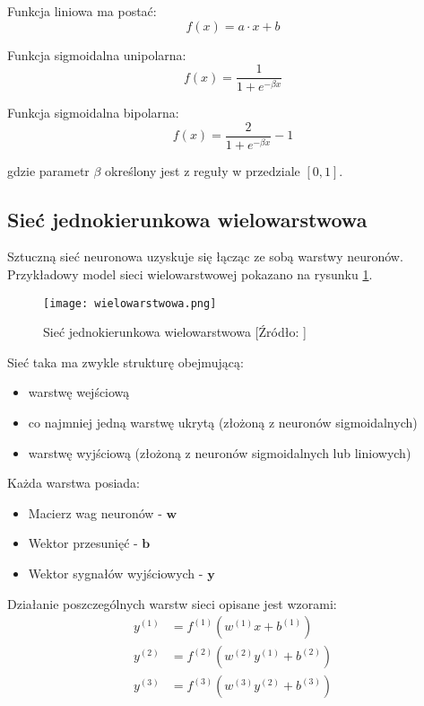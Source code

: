 \documentclass[12pt,twoside]{article}
\begin{document}
Funkcja liniowa ma postać:
\begin{equation}\label{lin}
f(x) = a \cdot x + b
\end{equation}

Funkcja sigmoidalna unipolarna:
\begin{equation}\label{siguni}
f(x) = \frac{1}{1 + e^{-\beta x}}
\end{equation}

Funkcja sigmoidalna bipolarna:
\begin{equation}\label{sigbi}
f(x) = \frac{2}{1 + e^{-\beta x}} -1
\end{equation}

gdzie parametr $\beta$ określony jest z reguły w przedziale $[0, 1]$.
\clearpage

\subsection{Sieć jednokierunkowa wielowarstwowa}

Sztuczną sieć neuronowa uzyskuje się łącząc ze sobą warstwy neuronów. Przykładowy model sieci wielowarstwowej pokazano na rysunku \ref{wielo}.

\begin{figure}[h]
\label{wielo}
\centering
\texttt{[image: wielowarstwowa.png]}
\caption{Sieć jednokierunkowa wielowarstwowa	[Źródło: \cite{zajdel1}]}
\end{figure}

Sieć taka ma zwykle strukturę obejmującą: 
\begin{itemize}
\item warstwę wejściową
\item co najmniej jedną warstwę ukrytą (złożoną z neuronów sigmoidalnych)
\item warstwę wyjściową (złożoną z neuronów sigmoidalnych lub liniowych)
\end{itemize}

Każda warstwa posiada:
\begin{itemize}
\item Macierz wag neuronów - $\textbf{w}$
\item Wektor przesunięć - $\textbf{b}$
\item Wektor sygnałów wyjściowych - $\textbf{y}$
\end{itemize}

Działanie poszczególnych warstw sieci opisane jest wzorami:
\begin{equation}\label{warstwy}
\begin{aligned}
y^{(1)} &= f^{(1)}(w^{(1)}x + b^{(1)})\\
y^{(2)} &= f^{(2)}(w^{(2)}y^{(1)} + b^{(2)})\\
y^{(3)} &= f^{(3)}(w^{(3)}y^{(2)} + b^{(3)})
\end{aligned}
\end{equation}
\end{document}
